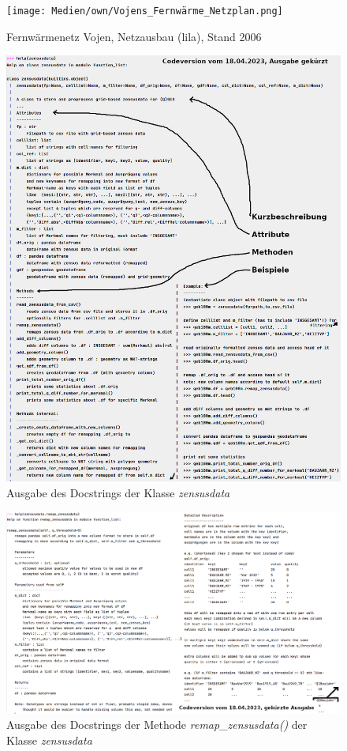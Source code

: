 		\begin{figure}[!h]
			\texttt{[image: Medien/own/Vojens\_Fernwärme\_Netzplan.png]}
			\caption{Fernwärmenetz Vojen, Netzausbau (lila), Stand 2006 \cite{web_vojens_plan}}
			\label{fig:Vojens_Fernwärmenetz_Plan}
		\end{figure}
	
	\begin{figure}[h]
		\centering
		\includegraphics[width=\linewidth]{./Medien/own/help_zensusdata2.png}
		\caption{Ausgabe des Docstrings der Klasse \textit{zensusdata}}
		\label{fig:help_zensusdata}
	\end{figure}

	\begin{figure}[h]
		\centering
		\includegraphics[angle=90,width=0.8\linewidth]{./Medien/own/help_zensusdata.remap_zensusdata.png}
		\caption{Ausgabe des Docstrings der Methode \textit{remap\_zensusdata()} der Klasse \textit{zensusdata}}
		\label{fig:help_zensusdata.remap_zensusdata}
	\end{figure}

